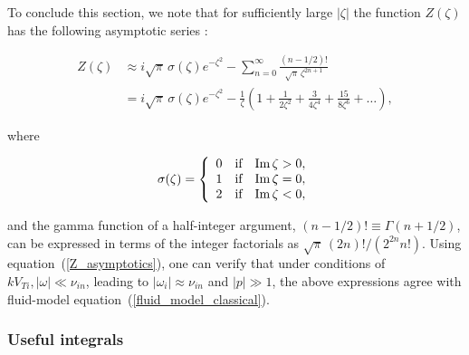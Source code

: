 \documentclass[draft]{agujournal2019}
\begin{document}
{To conclude this section, we note that for sufficiently large $|\zeta|$ the function
$Z(\zeta)$ has the following asymptotic series \cite{Fried:Plasma61}:
\begin{linenomath*}
\begin{align}
Z(\zeta)  & \approx i\sqrt{\pi}\,\sigma(\zeta)  e^{-\zeta^{2}}-\sum
_{n=0}^{\infty}\frac{(n-1/2)!}{\sqrt{\pi}\,\zeta^{2n+1}}\nonumber\\
& =i\sqrt{\pi}\,\sigma(\zeta)  e^{-\zeta^{2}}-\frac{1}{\zeta}\left(
1+\frac{1}{2\zeta^{2}}+\frac{3}{4\zeta^{4}}+\frac{15}{8\zeta^{6}}+\ldots\right),
\label{Z_asymptotics}
\end{align}
\end{linenomath*}
where
\begin{linenomath*}
\[
\sigma(\zeta)  =\left\{
\begin{array}
[c]{ccc}%
0 & \text{if} & \operatorname{Im}\zeta>0,\\
1 & \text{if} & \operatorname{Im}\zeta=0,\\
2 & \text{if} & \operatorname{Im}\zeta<0,
\end{array}
\right.  
\]
\end{linenomath*}
and the gamma function of a half-integer argument, $(n-1/2)!\equiv\Gamma(n+1/2)$, 
can be expressed in terms of the integer factorials as $\sqrt{\pi}\,(2n)!/(2^{2n}n!)$.
Using equation~(\ref{Z_asymptotics}), one can verify that under conditions of 
$kV_{Ti},|\omega| \ll\nu_{in}$, leading to $|\omega_i| \approx \nu_{in}$ and $|p|\gg 1$, 
the above expressions agree with fluid-model equation~(\ref{fluid_model_classical}). 

\subsubsection{Useful integrals\label{Useful integrals}}

}
\end{document}
